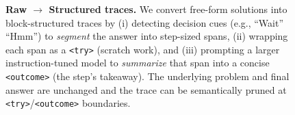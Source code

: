 \begin{figure}[t]
\caption{\textbf{Raw $\rightarrow$ Structured traces.} We convert free-form solutions into block-structured traces by (i) detecting decision cues (e.g., “Wait” “Hmm”) to \emph{segment} the answer into step-sized spans, (ii) wrapping each span as a \texttt{<try>} (scratch work), and (iii) prompting a larger instruction-tuned model to \emph{summarize} that span into a concise \texttt{<outcome>} (the step’s takeaway). The underlying problem and final answer are unchanged and the trace can be semantically pruned at \texttt{<try>}/\texttt{<outcome>} boundaries.}
\label{fig:raw-to-structured}
\end{figure}


